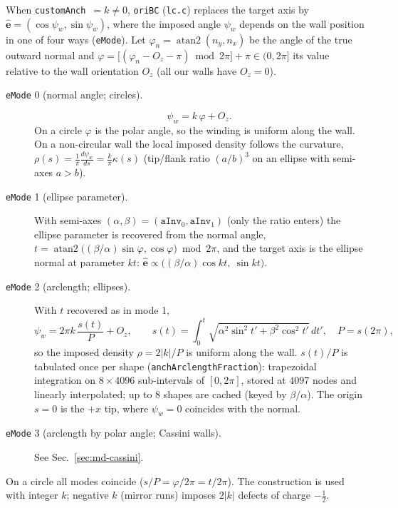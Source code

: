 When \texttt{customAnch}~$=k\neq0$, \texttt{oriBC} (\texttt{lc.c}) replaces the target axis by
$\hat{\mathbf e}=(\cos\psi_w,\sin\psi_w)$, where the imposed angle $\psi_w$ depends on the wall position
in one of four ways (\texttt{eMode}). Let $\varphi_n=\operatorname{atan2}(n_y,n_x)$ be the angle of the true
outward normal and $\varphi=\big[(\varphi_n-O_z-\pi)\bmod 2\pi\big]+\pi\in(0,2\pi]$ its value relative
to the wall orientation $O_z$ (all our walls have $O_z=0$).
\begin{description}
\item[\texttt{eMode} 0 (normal angle; circles).]
  \begin{equation}
    \psi_w=k\,\varphi+O_z .
    \label{eq:md-emode0}
  \end{equation}
  On a circle $\varphi$ is the polar angle, so the winding is uniform along the wall. On a non-circular wall the
  local imposed density follows the curvature, $\rho(s)=\frac1\pi\frac{d\psi_w}{ds}=\frac{k}{\pi}\kappa(s)$
  (tip/flank ratio $(a/b)^3$ on an ellipse with semi-axes $a>b$).
\item[\texttt{eMode} 1 (ellipse parameter).] With semi-axes $(\alpha,\beta)=(\texttt{aInv}_0,\texttt{aInv}_1)$
  (only the ratio enters) the ellipse parameter is recovered from the normal angle,
  $t=\operatorname{atan2}\!\big((\beta/\alpha)\sin\varphi,\cos\varphi\big)\bmod2\pi$, and the target axis is the
  ellipse normal at parameter $kt$: $\hat{\mathbf e}\propto\big((\beta/\alpha)\cos kt,\ \sin kt\big)$.
\item[\texttt{eMode} 2 (arclength; ellipses).] With $t$ recovered as in mode 1,
  \begin{equation}
    \psi_w=2\pi k\,\frac{s(t)}{P}+O_z,\qquad
    s(t)=\int_0^{t}\!\sqrt{\alpha^2\sin^2t'+\beta^2\cos^2t'}\,dt',\quad P=s(2\pi),
    \label{eq:md-emode2}
  \end{equation}
  so the imposed density $\rho=2|k|/P$ is uniform along the wall. $s(t)/P$ is tabulated once per shape
  (\texttt{anchArclengthFraction}): trapezoidal integration on $8\times4096$ sub-intervals of $[0,2\pi]$,
  stored at $4097$ nodes and linearly interpolated; up to $8$ shapes are cached (keyed by $\beta/\alpha$).
  The origin $s=0$ is the $+x$ tip, where $\psi_w=0$ coincides with the normal.
\item[\texttt{eMode} 3 (arclength by polar angle; Cassini walls).] See Sec.~\ref{sec:md-cassini}.
\end{description}
On a circle all modes coincide ($s/P=\varphi/2\pi=t/2\pi$). The construction is used with integer
$k$; negative $k$ (mirror runs) imposes $2|k|$ defects of charge $-\tfrac12$.

